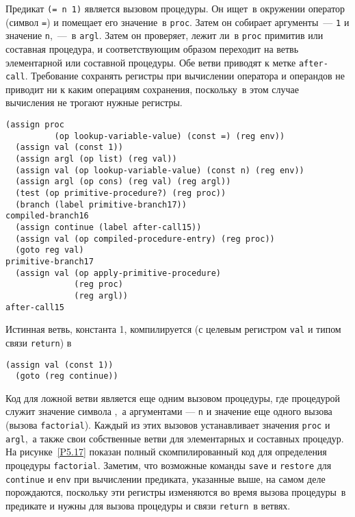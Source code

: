 Предикат {\tt (= n 1)} является вызовом процедуры.
Он ищет~в окружении оператор (символ {\tt =}) и помещает его
значение~в {\tt proc}.  Затем он собирает аргументы~---
{\tt 1} и значение {\tt n},~---~в {\tt argl}.
Затем он проверяет, лежит ли~в {\tt proc} примитив или
составная процедура, и соответствующим образом переходит на ветвь
элементарной или составной процедуры.  Обе ветви приводят к метке
{\tt after-call}.  Требование сохранять регистры при вычислении
оператора и операндов не приводит ни к каким операциям сохранения,
поскольку~в этом случае вычисления не трогают нужные регистры.

\begin{Verbatim}[fontsize=\small]
  (assign proc
          (op lookup-variable-value) (const =) (reg env))
  (assign val (const 1))
  (assign argl (op list) (reg val))
  (assign val (op lookup-variable-value) (const n) (reg env))
  (assign argl (op cons) (reg val) (reg argl))
  (test (op primitive-procedure?) (reg proc))
  (branch (label primitive-branch17))
compiled-branch16
  (assign continue (label after-call15))
  (assign val (op compiled-procedure-entry) (reg proc))
  (goto reg val)
primitive-branch17
  (assign val (op apply-primitive-procedure)
              (reg proc)
              (reg argl))
after-call15
\end{Verbatim}

Истинная ветвь, константа 1, компилируется (с целевым
регистром {\tt val} и типом связи {\tt return}) в

\begin{Verbatim}[fontsize=\small]
  (assign val (const 1))
  (goto (reg continue))
\end{Verbatim}
Код для ложной ветви является еще одним вызовом процедуры, где
процедурой служит значение символа {\tt *},~а аргументами
--- {\tt n} и значение еще одного вызова (вызова
{\tt factorial}).  Каждый из этих вызовов устанавливает
значения {\tt proc} и {\tt argl},~а также свои
собственные ветви для элементарных и составных процедур.  На 
рисунке~\ref{P5.17} показан полный скомпилированный код для
определения процедуры {\tt factorial}.  Заметим, что возможные
команды {\tt save} и {\tt restore} для
{\tt continue} и {\tt env} при вычислении предиката,
указанные выше, на самом деле порождаются, поскольку эти регистры
изменяются во время вызова процедуры~в предикате и нужны для вызова
процедуры и связи {\tt return}~в ветвях.

